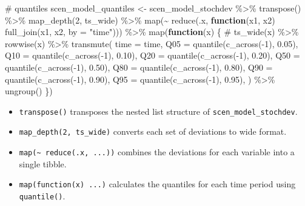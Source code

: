 \documentclass[
  letterpaper,
  DIV=11,
  numbers=noendperiod]{scrreport}
\newenvironment{Shaded}{\begin{snugshade}}{\end{snugshade}}
\newcommand{\AttributeTok}[1]{\textcolor[rgb]{0.40,0.45,0.13}{#1}}
\newcommand{\CommentTok}[1]{\textcolor[rgb]{0.37,0.37,0.37}{#1}}
\newcommand{\ControlFlowTok}[1]{\textcolor[rgb]{0.00,0.23,0.31}{\textbf{#1}}}
\newcommand{\DecValTok}[1]{\textcolor[rgb]{0.68,0.00,0.00}{#1}}
\newcommand{\FloatTok}[1]{\textcolor[rgb]{0.68,0.00,0.00}{#1}}
\newcommand{\FunctionTok}[1]{\textcolor[rgb]{0.28,0.35,0.67}{#1}}
\newcommand{\NormalTok}[1]{\textcolor[rgb]{0.00,0.23,0.31}{#1}}
\newcommand{\OtherTok}[1]{\textcolor[rgb]{0.00,0.23,0.31}{#1}}
\newcommand{\SpecialCharTok}[1]{\textcolor[rgb]{0.37,0.37,0.37}{#1}}
\newcommand{\StringTok}[1]{\textcolor[rgb]{0.13,0.47,0.30}{#1}}
\providecommand{\tightlist}{%
  \setlength{\itemsep}{0pt}\setlength{\parskip}{0pt}}\usepackage{longtable,booktabs,array}
\begin{document}
\begin{Shaded}
\begin{Highlighting}[]
\CommentTok{\# quantiles}
\NormalTok{scen\_model\_quantiles }\OtherTok{\textless{}{-}}\NormalTok{ scen\_model\_stochdev }\SpecialCharTok{\%\textgreater{}\%}
  \FunctionTok{transpose}\NormalTok{() }\SpecialCharTok{\%\textgreater{}\%}
  \FunctionTok{map\_depth}\NormalTok{(}\DecValTok{2}\NormalTok{, ts\_wide) }\SpecialCharTok{\%\textgreater{}\%}
  \FunctionTok{map}\NormalTok{(}\SpecialCharTok{\textasciitilde{}} \FunctionTok{reduce}\NormalTok{(.x, }\ControlFlowTok{function}\NormalTok{(x1, x2) }\FunctionTok{full\_join}\NormalTok{(x1, x2, }\AttributeTok{by =} \StringTok{"time"}\NormalTok{))) }\SpecialCharTok{\%\textgreater{}\%}
  \FunctionTok{map}\NormalTok{(}\ControlFlowTok{function}\NormalTok{(x) \{}
    \CommentTok{\# ts\_wide(x) \%\textgreater{}\%}
    \FunctionTok{rowwise}\NormalTok{(x) }\SpecialCharTok{\%\textgreater{}\%}
      \FunctionTok{transmute}\NormalTok{(}
        \AttributeTok{time =}\NormalTok{ time,}
        \AttributeTok{Q05 =} \FunctionTok{quantile}\NormalTok{(}\FunctionTok{c\_across}\NormalTok{(}\SpecialCharTok{{-}}\DecValTok{1}\NormalTok{), }\FloatTok{0.05}\NormalTok{),}
        \AttributeTok{Q10 =} \FunctionTok{quantile}\NormalTok{(}\FunctionTok{c\_across}\NormalTok{(}\SpecialCharTok{{-}}\DecValTok{1}\NormalTok{), }\FloatTok{0.10}\NormalTok{),}
        \AttributeTok{Q20 =} \FunctionTok{quantile}\NormalTok{(}\FunctionTok{c\_across}\NormalTok{(}\SpecialCharTok{{-}}\DecValTok{1}\NormalTok{), }\FloatTok{0.20}\NormalTok{),}
        \AttributeTok{Q50 =} \FunctionTok{quantile}\NormalTok{(}\FunctionTok{c\_across}\NormalTok{(}\SpecialCharTok{{-}}\DecValTok{1}\NormalTok{), }\FloatTok{0.50}\NormalTok{),}
        \AttributeTok{Q80 =} \FunctionTok{quantile}\NormalTok{(}\FunctionTok{c\_across}\NormalTok{(}\SpecialCharTok{{-}}\DecValTok{1}\NormalTok{), }\FloatTok{0.80}\NormalTok{),}
        \AttributeTok{Q90 =} \FunctionTok{quantile}\NormalTok{(}\FunctionTok{c\_across}\NormalTok{(}\SpecialCharTok{{-}}\DecValTok{1}\NormalTok{), }\FloatTok{0.90}\NormalTok{),}
        \AttributeTok{Q95 =} \FunctionTok{quantile}\NormalTok{(}\FunctionTok{c\_across}\NormalTok{(}\SpecialCharTok{{-}}\DecValTok{1}\NormalTok{), }\FloatTok{0.95}\NormalTok{),}
\NormalTok{      ) }\SpecialCharTok{\%\textgreater{}\%}
      \FunctionTok{ungroup}\NormalTok{()}
\NormalTok{  \})}
\end{Highlighting}
\end{Shaded}

\begin{itemize}
\tightlist
\item
  \texttt{transpose()} transposes the nested list structure of
  \texttt{scen\_model\_stochdev}.
\item
  \texttt{map\_depth(2,\ ts\_wide)} converts each set of deviations to
  wide format.
\item
  \texttt{map(\textasciitilde{}\ reduce(.x,\ ...))} combines the
  deviations for each variable into a single tibble.
\item
  \texttt{map(function(x)\ ...)} calculates the quantiles for each time
  period using \texttt{quantile()}.
\end{itemize}
\end{document}
